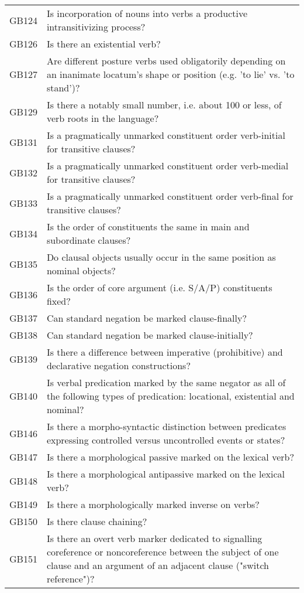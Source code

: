 \begin{longtable}{p{3cm}p{12cm}}
  GB124 & Is incorporation of nouns into verbs a productive intransitivizing process? \\ 
  GB126 & Is there an existential verb? \\ 
  GB127 & Are different posture verbs used obligatorily depending on an inanimate locatum's shape or position (e.g. 'to lie' vs. 'to stand')? \\ 
  GB129 & Is there a notably small number, i.e. about 100 or less, of verb roots in the language? \\ 
  GB131 & Is a pragmatically unmarked constituent order verb-initial for transitive clauses? \\ 
  GB132 & Is a pragmatically unmarked constituent order verb-medial for transitive clauses? \\ 
  GB133 & Is a pragmatically unmarked constituent order verb-final for transitive clauses? \\ 
  GB134 & Is the order of constituents the same in main and subordinate clauses? \\ 
  GB135 & Do clausal objects usually occur in the same position as nominal objects? \\ 
  GB136 & Is the order of core argument (i.e. S/A/P) constituents fixed? \\ 
  GB137 & Can standard negation be marked clause-finally? \\ 
  GB138 & Can standard negation be marked clause-initially? \\ 
  GB139 & Is there a difference between imperative (prohibitive) and declarative negation constructions? \\ 
  GB140 & Is verbal predication marked by the same negator as all of the following types of predication: locational, existential and nominal? \\ 
  GB146 & Is there a morpho-syntactic distinction between predicates expressing controlled versus uncontrolled events or states? \\ 
  GB147 & Is there a morphological passive marked on the lexical verb? \\ 
  GB148 & Is there a morphological antipassive marked on the lexical verb? \\ 
  GB149 & Is there a morphologically marked inverse on verbs? \\ 
  GB150 & Is there clause chaining? \\ 
  GB151 & Is there an overt verb marker dedicated to signalling coreference or noncoreference between the subject of one clause and an argument of an adjacent clause ("switch reference")? \\ 

\end{longtable}
